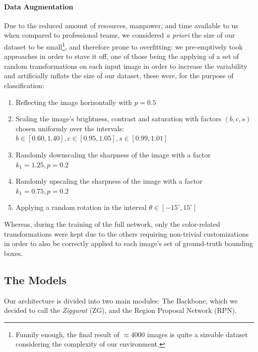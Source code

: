 \documentclass[10pt,journal,cspaper,compsoc]{IEEEtran}
\begin{document}
    \paragraph*{Data Augmentation}
    Due to the reduced amount of resources, manpower, and time available to us when compared to professional teams, we considered \emph{a priori} the size of our dataset to be small\footnote{Funnily enough, the final result of $\approx4000$ images is quite a sizeable dataset considering the complexity of our environment.}, and therefore 
    prone to overfitting: we pre-emptively took approaches in order to stave it off, one of those being the applying of a set of random transformations on each input image 
    in order to increase the variability and artificially inflate the size of our dataset, these were, for the purpose of classification:
    \begin{enumerate}
        \item Reflecting the image horizontally with $p = 0.5$
        \item Scaling the image's brightness, contrast and saturation 
        with factors $(b, c, s)$ chosen uniformly over 
        the intervals: $b \in [0.60, 1.40], c \in [0.95, 1.05], s \in [0.99, 1.01]$
        \item Randomly downscaling the sharpness of the image with a factor $k_1 = 1.25, p = 0.2$
        \item Randomly upscaling the sharpness of the image with a factor $k_1 = 0.75, p = 0.2$
        \item Applying a random rotation 
        in the interval $\theta \in [-15^{\circ}, 15^{\circ}]$
    \end{enumerate}
    Whereas, during the training of the full network, only the color-related transformations were kept 
    due to the others requiring non-trivial customizations in order to also be correctly applied to each 
    image's set of ground-truth bounding boxes. 
    
    \subsection{The Models}
    Our architecture is divided into two main modules: The Backbone, which we decided to call the \emph{Ziggurat} (ZG), and the Region Proposal Network (RPN).
\end{document}
